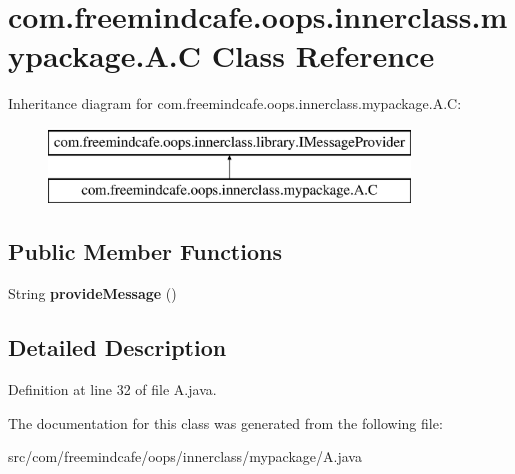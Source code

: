 \hypertarget{classcom_1_1freemindcafe_1_1oops_1_1innerclass_1_1mypackage_1_1_a_1_1_c}{}\section{com.\+freemindcafe.\+oops.\+innerclass.\+mypackage.\+A.\+C Class Reference}
\label{classcom_1_1freemindcafe_1_1oops_1_1innerclass_1_1mypackage_1_1_a_1_1_c}
Inheritance diagram for com.\+freemindcafe.\+oops.\+innerclass.\+mypackage.\+A.\+C\+:\begin{figure}[H]
\begin{center}
\leavevmode
\includegraphics[height=2.000000cm]{classcom_1_1freemindcafe_1_1oops_1_1innerclass_1_1mypackage_1_1_a_1_1_c}
\end{center}
\end{figure}
\subsection*{Public Member Functions}
\begin{DoxyCompactItemize}
\item 
\hypertarget{classcom_1_1freemindcafe_1_1oops_1_1innerclass_1_1mypackage_1_1_a_1_1_c_ade46c484edda434671b53271918275be}{}String {\bfseries provide\+Message} ()\label{classcom_1_1freemindcafe_1_1oops_1_1innerclass_1_1mypackage_1_1_a_1_1_c_ade46c484edda434671b53271918275be}

\end{DoxyCompactItemize}


\subsection{Detailed Description}


Definition at line 32 of file A.\+java.



The documentation for this class was generated from the following file\+:\begin{DoxyCompactItemize}
\item 
src/com/freemindcafe/oops/innerclass/mypackage/A.\+java\end{DoxyCompactItemize}
